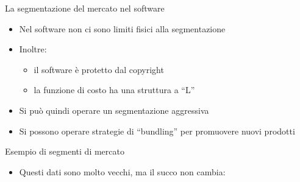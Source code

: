 \documentclass{beamer}
\begin{document}
\begin{frame}
{\centerline{La segmentazione del mercato nel software}}
\begin{itemize}
\item Nel software non ci sono limiti fisici alla segmentazione
\item Inoltre:
\begin{itemize}
\item il software \`{e} protetto dal copyright
\item la funzione di costo ha una struttura a ``L''
\end{itemize}
\item Si pu\`{o} quindi operare un segmentazione aggressiva
\item Si possono operare strategie di ``bundling'' per promuovere nuovi prodotti
\end{itemize}

\end{frame}

\begin{frame}
{\centerline{Esempio di segmenti di mercato}}

\begin{itemize}
    \item Questi dati sono molto vecchi, ma il succo non cambia:
\end{itemize}

\begin{center}
    
\end{center}
\end{frame}
\end{document}
